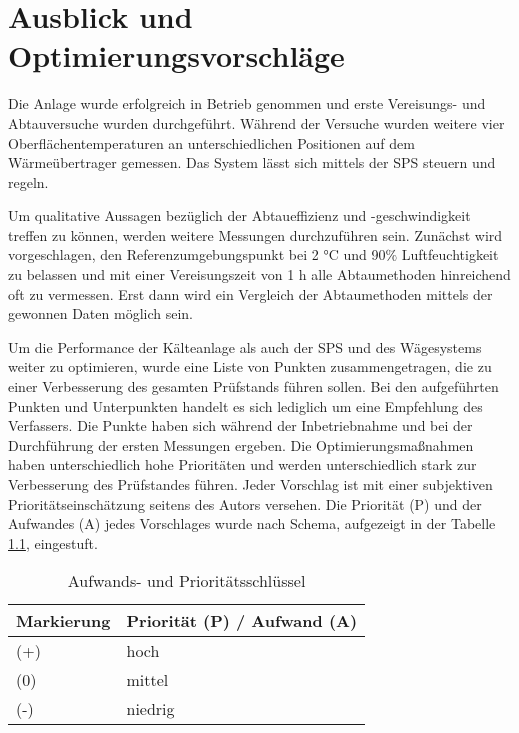 \chapter{Ausblick und Optimierungsvorschläge}
\label{cha:Ausblick}

Die Anlage wurde erfolgreich in Betrieb genommen und erste Vereisungs- und Abtauversuche wurden durchgeführt. Während der Versuche wurden weitere vier Oberflächentemperaturen an unterschiedlichen Positionen auf dem Wärmeübertrager gemessen. Das System lässt sich mittels der SPS steuern und regeln.

Um qualitative Aussagen bezüglich der Abtaueffizienz und -geschwindigkeit treffen zu können, werden weitere Messungen durchzuführen sein. Zunächst wird vorgeschlagen, den Referenzumgebungspunkt bei 2 °C und 90$\%$ Luftfeuchtigkeit zu belassen und mit einer Vereisungszeit von 1 h alle Abtaumethoden hinreichend oft zu vermessen. Erst dann wird ein Vergleich der Abtaumethoden mittels der gewonnen Daten möglich sein. 

Um die Performance der Kälteanlage als auch der SPS und des Wägesystems weiter zu optimieren, wurde eine Liste von Punkten zusammengetragen, die zu einer Verbesserung des gesamten Prüfstands führen sollen. Bei den aufgeführten Punkten und Unterpunkten handelt es sich lediglich um eine Empfehlung des Verfassers. Die Punkte haben sich während der Inbetriebnahme und bei der Durchführung der ersten Messungen ergeben. Die Optimierungsmaßnahmen haben unterschiedlich hohe Prioritäten und werden unterschiedlich stark zur Verbesserung des Prüfstandes führen. Jeder Vorschlag ist mit einer subjektiven Prioritätseinschätzung seitens des Autors versehen. Die Priorität (P) und der Aufwandes (A) jedes Vorschlages wurde nach Schema, aufgezeigt in der Tabelle \ref{tab:Bewertung}, eingestuft. 


\begin{table}[htb]
\centering
\caption{Aufwands- und Prioritätsschlüssel}\vspace{6pt}
\begin{tabular}{ll}
\hline 
\textbf{Markierung} & \textbf{Priorität (P) / Aufwand (A)} \\ 
\hline 
\hline 
(+) & hoch \\ 
\hline 
(0) & mittel  \\ 
\hline 
(-) & niedrig \\ 
\hline 
\hline
\end{tabular} 
\label{tab:Bewertung}
\end{table}

